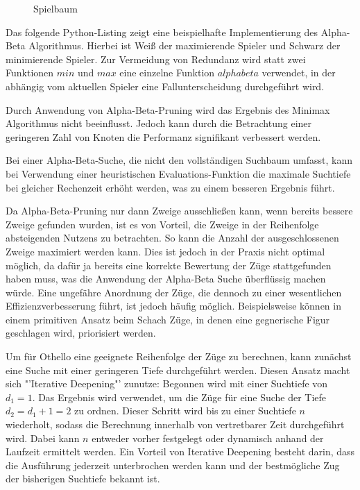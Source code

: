 \begin{figure}[]
    \centering
    \caption{Spielbaum}
    \label{fig:game_tree_ab_pruning}
\end{figure}

Das folgende Python-Listing zeigt eine beispielhafte Implementierung des Alpha-Beta Algorithmus. Hierbei ist Weiß der
maximierende Spieler und Schwarz der minimierende Spieler. Zur Vermeidung von Redundanz wird statt zwei Funktionen $min$
und $max$ eine einzelne Funktion $alphabeta$ verwendet, in der abhängig vom aktuellen Spieler eine Fallunterscheidung
durchgeführt wird.



Durch Anwendung von Alpha-Beta-Pruning wird das Ergebnis des Minimax Algorithmus nicht beeinflusst. Jedoch kann durch
die Betrachtung einer geringeren Zahl von Knoten die Performanz signifikant verbessert werden.

Bei einer Alpha-Beta-Suche, die nicht den vollständigen Suchbaum umfasst, kann bei Verwendung einer heuristischen
Evaluations-Funktion die maximale Suchtiefe bei gleicher Rechenzeit erhöht werden, was zu einem besseren Ergebnis führt.

Da Alpha-Beta-Pruning nur dann Zweige ausschließen kann, wenn bereits bessere Zweige gefunden wurden, ist es von
Vorteil, die Zweige in der Reihenfolge absteigenden Nutzens zu betrachten. So kann die Anzahl der ausgeschlossenen
Zweige maximiert werden kann. Dies ist jedoch in der Praxis nicht optimal möglich, da dafür ja bereits eine korrekte
Bewertung der Züge stattgefunden haben muss, was die Anwendung der Alpha-Beta Suche überflüssig machen würde. Eine
ungefähre Anordnung der Züge, die dennoch zu einer wesentlichen Effizienzverbesserung führt, ist jedoch häufig möglich.
Beispielsweise können in einem primitiven Ansatz beim Schach Züge, in denen eine gegnerische Figur geschlagen wird,
priorisiert werden.

Um für Othello eine geeignete Reihenfolge der Züge zu berechnen, kann zunächst eine Suche mit einer geringeren Tiefe
durchgeführt werden. Diesen Ansatz macht sich "'Iterative Deepening"' zunutze: Begonnen wird mit einer Suchtiefe von
$d_1=1$. Das Ergebnis wird verwendet, um die Züge für eine Suche der Tiefe $d_2=d_1+1=2$ zu ordnen. Dieser Schritt wird
bis zu einer Suchtiefe $n$ wiederholt, sodass die Berechnung innerhalb von vertretbarer Zeit durchgeführt wird. Dabei
kann $n$ entweder vorher festgelegt oder dynamisch anhand der Laufzeit ermittelt werden. Ein Vorteil von Iterative
Deepening besteht darin, dass die Ausführung jederzeit unterbrochen werden kann und der bestmögliche Zug der bisherigen
Suchtiefe bekannt ist.
\cite{alphabetaefficiency}

